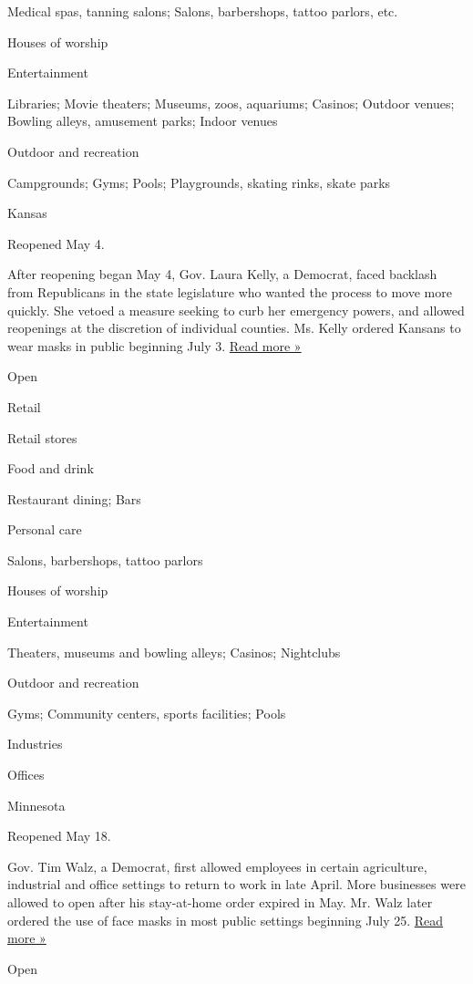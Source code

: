 Medical spas, tanning salons; Salons, barbershops, tattoo parlors, etc.

Houses of worship

Entertainment

Libraries; Movie theaters; Museums, zoos, aquariums; Casinos; Outdoor
venues; Bowling alleys, amusement parks; Indoor venues

Outdoor and recreation

Campgrounds; Gyms; Pools; Playgrounds, skating rinks, skate parks

Kansas

Reopened May 4.

After reopening began May 4, Gov. Laura Kelly, a Democrat, faced
backlash from Republicans in the state legislature who wanted the
process to move more quickly. She vetoed a measure seeking to curb her
emergency powers, and allowed reopenings at the discretion of individual
counties. Ms. Kelly ordered Kansans to wear masks in public beginning
July 3.
\href{https://www.kansas.com/news/politics-government/article244554662.html}{Read
more »}

Open

Retail

Retail stores

Food and drink

Restaurant dining; Bars

Personal care

Salons, barbershops, tattoo parlors

Houses of worship

Entertainment

Theaters, museums and bowling alleys; Casinos; Nightclubs

Outdoor and recreation

Gyms; Community centers, sports facilities; Pools

Industries

Offices

Minnesota

Reopened May 18.

Gov. Tim Walz, a Democrat, first allowed employees in certain
agriculture, industrial and office settings to return to work in late
April. More businesses were allowed to open after his stay-at-home order
expired in May. Mr. Walz later ordered the use of face masks in most
public settings beginning July 25.
\href{https://www.startribune.com/walz-mandates-masks-indoors-across-state/571861471/}{Read
more »}

Open

